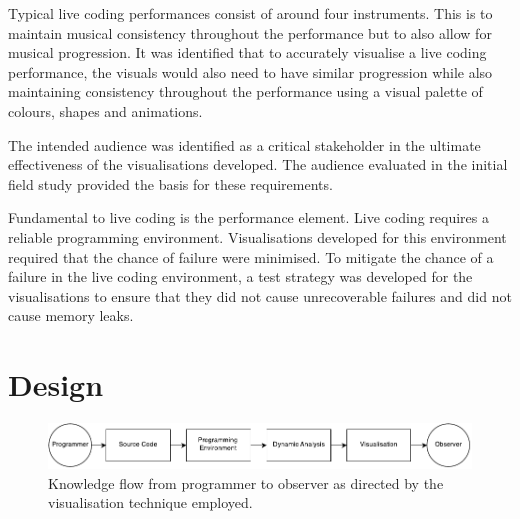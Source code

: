 Typical live coding performances consist of around four instruments. This is to maintain musical consistency throughout the performance but to also allow for musical progression. It was identified that to accurately visualise a live coding performance, the visuals would also need to have similar progression while also maintaining consistency throughout the performance using a visual palette of colours, shapes and animations.

The intended audience was identified as a critical stakeholder in the ultimate effectiveness of the visualisations developed. The audience evaluated in the initial field study provided the basis for these requirements.



Fundamental to live coding is the performance element. Live coding requires a reliable programming environment. Visualisations developed for this environment required that the chance of failure were minimised. To mitigate the chance of a failure in the live coding environment, a test strategy was developed for the visualisations to ensure that they did not cause unrecoverable failures and did not cause memory leaks.




\section{Design}

\begin{figure}
  \centering \includegraphics[width=\columnwidth]{../images/diagrams/knowledge-flow-initial.pdf}
  \caption{Knowledge flow from programmer to observer as directed by the visualisation technique employed.}
\label{fig:knowledge-flow-initial}
\end{figure}

